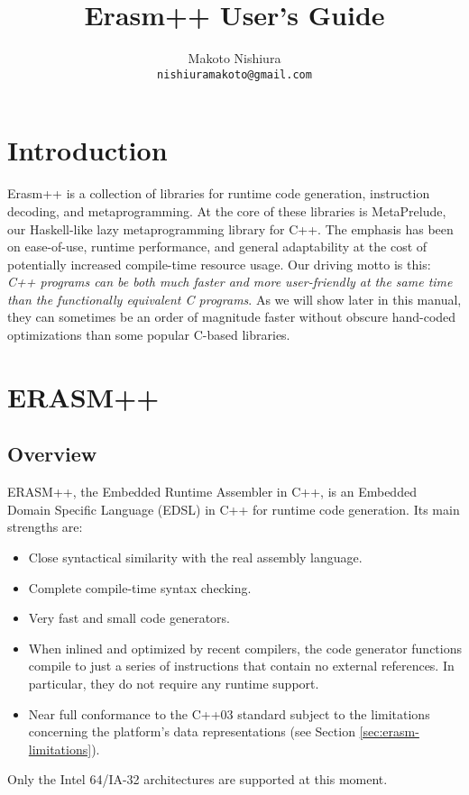 \documentclass{article}
\begin{document}
\lstset{language=C++}

\title{Erasm++ User's Guide}
\author{Makoto Nishiura \\
\texttt{nishiuramakoto@gmail.com}}

\maketitle

\tableofcontents

\section{Introduction}
\label{sec:introduction}

Erasm++ is a collection of libraries for runtime code generation,
instruction decoding, and metaprogramming. At the core of these
libraries is MetaPrelude, our Haskell-like lazy metaprogramming
library for C++. The emphasis has been on ease-of-use, runtime
performance, and general adaptability at the cost of potentially
increased compile-time resource usage. Our driving motto is this:
\emph{C++ programs can be both much faster and more user-friendly at
  the same time than the functionally equivalent C programs}. As we
will show later in this manual, they can sometimes be an order of
magnitude faster without obscure hand-coded optimizations than some
popular C-based libraries.

\section{ERASM++}
\label{sec:erasm++}

\subsection{Overview}
\label{sec:overview}

ERASM++, the Embedded Runtime Assembler in C++, is an Embedded Domain
Specific Language (EDSL) in C++ for runtime code generation. Its main
strengths are:
\begin{itemize}
\item  Close syntactical similarity with the real assembly
  language.
\item  Complete compile-time syntax checking.
\item Very fast and small code generators.
\item When inlined and optimized by recent compilers, the code
  generator functions compile to just a series of  instructions
  that contain no external references.  In particular, they do not
  require any runtime support.
\item Near full conformance to the C++03 standard subject to the
  limitations concerning the platform's data representations (see
  Section \ref{sec:erasm-limitations}).
\end{itemize}
Only the Intel 64/IA-32 architectures are supported at this moment. 
\end{document}
